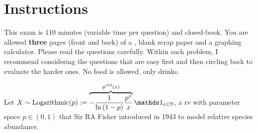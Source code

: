\documentclass[12pt,landscape]{article}
\begin{document}
\section*{Instructions}
This exam is 110 minutes (variable time per question) and closed-book. You are allowed \textbf{three} pages (front and back) of a , blank scrap paper and a graphing calculator. Please read the questions carefully. Within each problem, I recommend considering the questions that are easy first and then circling back to evaluate the harder ones. No food is allowed, only drinks. %

\pagebreak



\problem{} Let $X \sim \text{Logarithmic}(p) := \overbrace{-\displaystyle\oneover{\natlog{1-p}}\frac{p^x}{x}}^{p^{old}(x)} \indic{x \in \naturals}$, a rv with parameter space $p \in (0,1)$ that Sir RA Fisher introduced in 1943 to model relative species abundance. 
\end{document}
